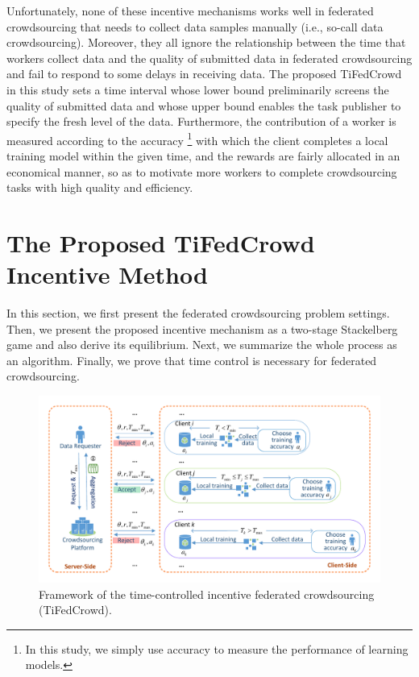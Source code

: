 \documentclass[final,1p,times]{elsarticle}
\begin{document}
Unfortunately, none of these incentive mechanisms works well in federated crowdsourcing that needs to collect data samples manually (i.e., so-call data crowdsourcing). Moreover, they all ignore the relationship between the time that workers collect data and the quality of submitted data in federated crowdsourcing and fail to respond to some delays in receiving data. The proposed TiFedCrowd in this study sets a time interval whose lower bound preliminarily screens the quality of submitted data and whose upper bound enables the task publisher to specify the fresh level of the data. Furthermore, the contribution of a worker is measured according to the accuracy \footnote{In this study, we simply use accuracy to measure the performance of learning models.} with which the client completes a local training model within the given time, and the rewards are fairly allocated in an economical manner, so as to motivate more workers to complete crowdsourcing tasks with high quality and efficiency.

\section{The Proposed TiFedCrowd Incentive Method} \label{sec:mtd}
In this section, we first present the federated crowdsourcing problem settings. Then, we present the proposed incentive mechanism as a two-stage Stackelberg game and also derive its equilibrium. Next, we summarize the whole process as an algorithm. Finally, we prove that time control is necessary for federated crowdsourcing.

\begin{figure}
	\centering
	\centerline{\includegraphics[width=5.5in]{TiFedCrowd framework.pdf}}
	\caption{Framework of the time-controlled incentive federated crowdsourcing (TiFedCrowd).}
	\label{fig:framework}
\end{figure}
\end{document}
